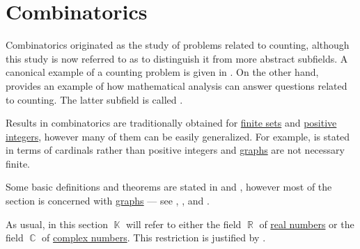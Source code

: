 \section{Combinatorics}\label{sec:combinatorics}

Combinatorics originated as the study of problems related to counting, although this study is now referred to as  to distinguish it from more abstract subfields. A canonical example of a counting problem is given in . On the other hand,  provides an example of how mathematical analysis can answer questions related to counting. The latter subfield is called .

Results in combinatorics are traditionally obtained for \hyperref[def:set_finiteness]{finite sets} and \hyperref[rem:peano_arithmetic_zero/positive]{positive integers}, however many of them can be easily generalized. For example,  is stated in terms of cardinals rather than positive integers and \hyperref[def:graph/directed]{graphs} are not necessary finite.

Some basic definitions and theorems are stated in  and , however most of the section is concerned with \hyperref[def:graph]{graphs} --- see , ,  and .

As usual, in this section \( \BbbK \) will refer to either the field \( \BbbR \) of \hyperref[def:set_of_real_numbers]{real numbers} or the field \( \BbbC \) of \hyperref[def:set_of_real_numbers]{complex numbers}. This restriction is justified by .

